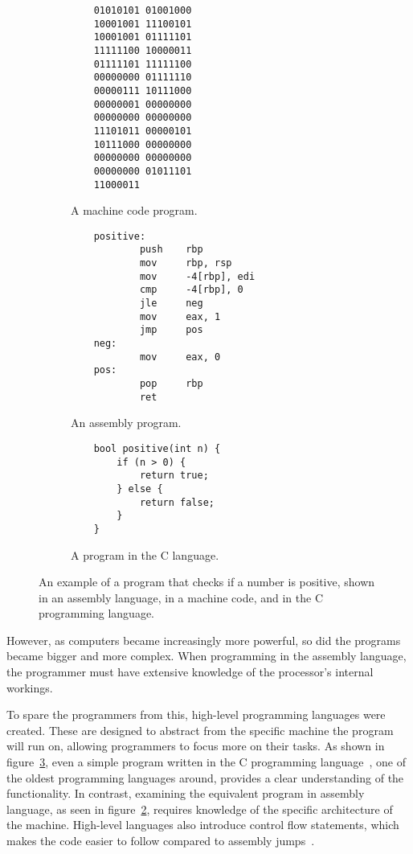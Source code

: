 \begin{figure}
    \begin{subfigure}{1.0\textwidth}
        \begin{lstlisting}
    01010101 01001000
    10001001 11100101
    10001001 01111101
    11111100 10000011
    01111101 11111100
    00000000 01111110
    00000111 10111000
    00000001 00000000
    00000000 00000000
    11101011 00000101
    10111000 00000000
    00000000 00000000
    00000000 01011101
    11000011
        \end{lstlisting}
        \caption{A machine code program.}
        \label{subfig:machine-code}
    \end{subfigure}
    \begin{subfigure}{1.0\textwidth}
        \begin{lstlisting}
    positive:
            push    rbp
            mov     rbp, rsp
            mov     -4[rbp], edi
            cmp     -4[rbp], 0
            jle     neg
            mov     eax, 1
            jmp     pos
    neg:
            mov     eax, 0
    pos:
            pop     rbp
            ret
        \end{lstlisting}
        \caption{An assembly program.}
        \label{subfig:assembly}
    \end{subfigure}\vspace{0.5cm}
    \begin{subfigure}{1.0\textwidth}
        \begin{verbatim}
    bool positive(int n) {
        if (n > 0) {
            return true;
        } else {
            return false;
        }
    }
        \end{verbatim}
        \caption{A program in the C language.}
        \label{subfig:c}
    \end{subfigure}
    \vspace{0.5cm}
    \caption{An example of a program that checks if a number is positive, shown
    in an assembly language, in a machine code, and in the C programming
    language.}
    \label{fig:simple-assembly}
\end{figure}

However, as computers became increasingly more powerful, so did the programs
became bigger and more complex. When programming in the assembly language, the
programmer must have extensive knowledge of the processor's internal workings.

To spare the programmers from this, high-level programming languages were
created. These are designed to abstract from the specific machine the program
will run on, allowing programmers to focus more on their tasks. As shown in
figure~\ref{subfig:c}, even a simple program written in the C programming
language~\cite{krc}, one of the oldest programming languages around, provides a
clear understanding of the functionality. In contrast, examining the equivalent
program in assembly language, as seen in figure~\ref{subfig:assembly}, requires
knowledge of the specific architecture of the machine. High-level languages
also introduce control flow statements, which makes the code easier to follow
compared to assembly jumps~\cite{gotobad}.

